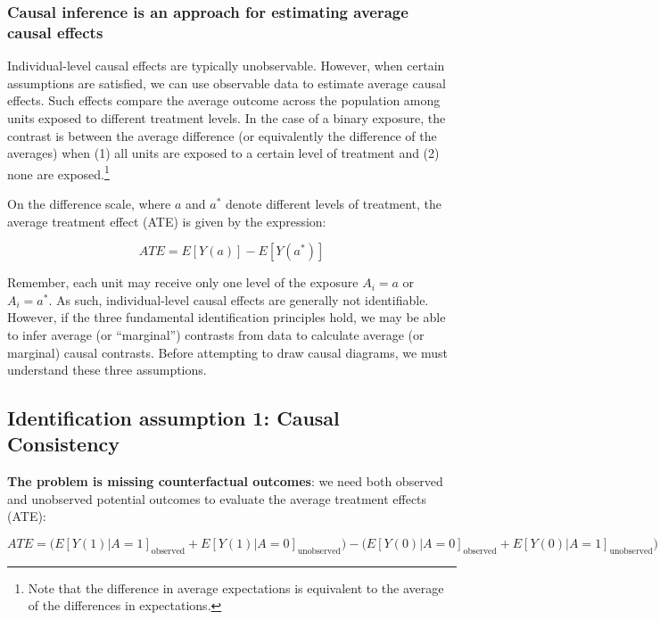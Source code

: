 \documentclass[
  singlecolumn]{report}
\begin{document}
\hypertarget{causal-inference-is-an-approach-for-estimating-average-causal-effects}{%
\subsubsection{Causal inference is an approach for estimating average
causal
effects}\label{causal-inference-is-an-approach-for-estimating-average-causal-effects}}

Individual-level causal effects are typically unobservable. However,
when certain assumptions are satisfied, we can use observable data to
estimate average causal effects. Such effects compare the average
outcome across the population among units exposed to different treatment
levels. In the case of a binary exposure, the contrast is between the
average difference (or equivalently the difference of the averages) when
(1) all units are exposed to a certain level of treatment and (2) none
are exposed.\footnote{Note that the difference in average expectations
  is equivalent to the average of the differences in expectations.}

On the difference scale, where \(a\) and \(a^*\) denote different levels
of treatment, the average treatment effect (ATE) is given by the
expression:

\[
ATE = E[Y(a)] - E[Y(a^*)]
\]

Remember, each unit may receive only one level of the exposure
\(A_i = a\) or \(A_i = a^*\). As such, individual-level causal effects
are generally not identifiable. However, if the three fundamental
identification principles hold, we may be able to infer average (or
``marginal'') contrasts from data to calculate average (or marginal)
causal contrasts. Before attempting to draw causal diagrams, we must
understand these three assumptions.

\hypertarget{identification-assumption-1-causal-consistency}{%
\subsection{Identification assumption 1: Causal
Consistency}\label{identification-assumption-1-causal-consistency}}

\textbf{The problem is missing counterfactual outcomes}: we need both
observed and unobserved potential outcomes to evaluate the average
treatment effects (ATE):

\[
ATE = \bigg(E[Y(1)|A = 1]_{\text{observed}} + E[Y(1)|A = 0]_{\text{unobserved}}\bigg) - \bigg(E[Y(0)|A = 0]_{\text{observed}}  + E[Y(0)|A = 1]_{\text{unobserved}}\bigg)
\]
\end{document}
